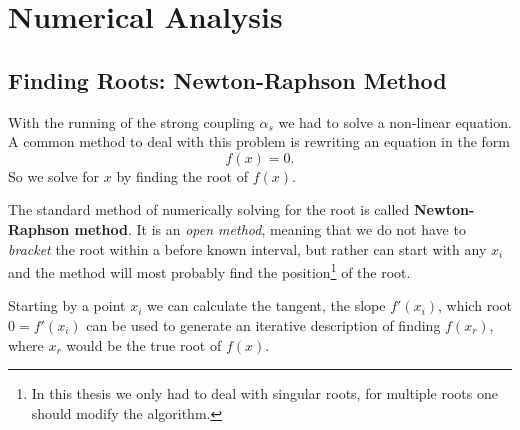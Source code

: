 		
	
		

		
		
\section{Numerical Analysis}
\cite{Chapra2015} \cite{Press2007}
\subsection{Finding Roots: Newton-Raphson Method}
With the running of the strong coupling $\alpha_s$ we had to solve a non-linear equation. A common method to deal with this problem is rewriting an equation in the form
\begin{equation}
	f(x) = 0.
\end{equation}
So we solve for $x$ by finding the root of $f(x)$. 

The standard method of numerically solving for the root is called \textbf{Newton-Raphson method}. It is an \textit{open method}, meaning that we do not have to \textit{bracket} the root within a before known interval, but rather can start with any $x_i$ and the method will most probably find the position\footnote{In this thesis we only had to deal with singular roots, for multiple roots one should modify the algorithm.} of the root.

Starting by a point $x_i$ we can calculate the tangent, the slope $f'(x_i)$, which root $0 = f'(x_i)$ can be used to generate an iterative description of finding $f(x_r)$, where $x_r$ would be the true root of $f(x)$. 

